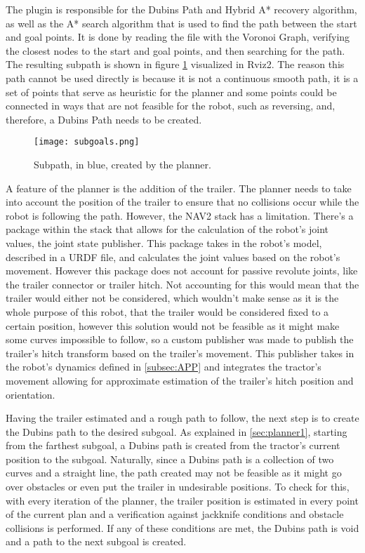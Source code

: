 The plugin is responsible for the Dubins Path and Hybrid A* recovery algorithm, 
as well as the A* search algorithm that is used to find the path between the start and goal points. It is done 
by reading the file with the Voronoi Graph, verifying the closest nodes to the 
start and goal points, and then searching for the path. The resulting subpath is 
shown in figure \ref{fig:subgoals} visualized in Rviz2.
The reason this path cannot be used directly is because it is not a continuous 
smooth path, it is a set of points that serve as heuristic for the planner and 
some points could be connected in ways that are not feasible for the robot, such as reversing, and, therefore, 
a Dubins Path needs to be created.
\begin{figure}[h]
    \centering
    \texttt{[image: subgoals.png]}
    \caption{Subpath, in blue, created by the planner.}
    \label{fig:subgoals}
\end{figure}

A feature of the planner is the addition of the trailer. The planner needs to take into account 
the position of the trailer to ensure that no collisions occur while the robot is 
following the path. However, the \gls{NAV2} stack has a limitation. There's a package 
within the stack that allows for the calculation of the robot's joint values, the joint state 
publisher. This package takes in the robot's model, described in a \gls{URDF} file, and calculates the joint values 
based on the robot's movement. However this package does not account for passive revolute joints, like 
the trailer connector or trailer hitch. Not accounting for this would mean 
that the trailer would either not be considered, which wouldn't make sense 
as it is the whole purpose of this robot, that the trailer would be considered 
fixed to a certain position, however this solution would not be feasible as it might make 
some curves impossible to follow, so a custom publisher was made to publish the trailer's hitch 
transform based on the trailer's movement. This publisher takes in the robot's 
dynamics defined in \ref{subsec:APP} and integrates the tractor's movement 
allowing for approximate estimation of the trailer's hitch position and orientation.


Having the trailer estimated and a rough path to follow, the next step is to create the 
Dubins path to the desired subgoal. As explained in \ref{sec:planner1}, starting from the farthest subgoal, 
a Dubins path is created from the tractor's current position to the subgoal. Naturally, since a Dubins 
path is a collection of two curves and a straight line, the path created may not be feasible as it might 
go over obstacles or even put the trailer in undesirable positions. To check for this, with every iteration 
of the planner, the trailer position is estimated in every point of the current plan and a verification 
against jackknife conditions and obstacle collisions is performed. If any of these conditions 
are met, the Dubins path is void and a path to the next subgoal is created.

